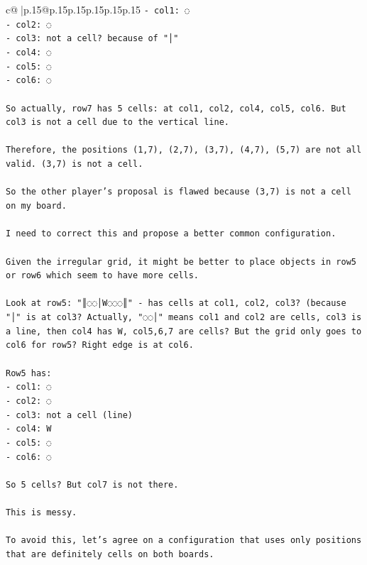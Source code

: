 \documentclass{article}
\begin{document}
{\begin{supertabular}{c@{$\;$}|p{.15\linewidth}@{}p{.15\linewidth}p{.15\linewidth}p{.15\linewidth}p{.15\linewidth}p{.15\linewidth}}
{{{\texttt{{-} col1: ◌} \\
\texttt{{-} col2: ◌} \\
\texttt{{-} col3: not a cell? because of "│"} \\
\texttt{{-} col4: ◌} \\
\texttt{{-} col5: ◌} \\
\texttt{{-} col6: ◌} \\
\\ 
\texttt{So actually, row7 has 5 cells: at col1, col2, col4, col5, col6. But col3 is not a cell due to the vertical line.} \\
\\ 
\texttt{Therefore, the positions (1,7), (2,7), (3,7), (4,7), (5,7) are not all valid. (3,7) is not a cell.} \\
\\ 
\texttt{So the other player's proposal is flawed because (3,7) is not a cell on my board.} \\
\\ 
\texttt{I need to correct this and propose a better common configuration.} \\
\\ 
\texttt{Given the irregular grid, it might be better to place objects in row5 or row6 which seem to have more cells.} \\
\\ 
\texttt{Look at row5: "║◌◌│W◌◌◌║" {-} has cells at col1, col2, col3? (because "│" is at col3? Actually, "◌◌│" means col1 and col2 are cells, col3 is a line, then col4 has W, col5,6,7 are cells? But the grid only goes to col6 for row5? Right edge is at col6.} \\
\\ 
\texttt{Row5 has:} \\
\texttt{{-} col1: ◌} \\
\texttt{{-} col2: ◌} \\
\texttt{{-} col3: not a cell (line)} \\
\texttt{{-} col4: W} \\
\texttt{{-} col5: ◌} \\
\texttt{{-} col6: ◌} \\
\\ 
\texttt{So 5 cells? But col7 is not there.} \\
\\ 
\texttt{This is messy.} \\
\\ 
\texttt{To avoid this, let's agree on a configuration that uses only positions that are definitely cells on both boards.} \\
}}}
\end{supertabular}}
\end{document}
